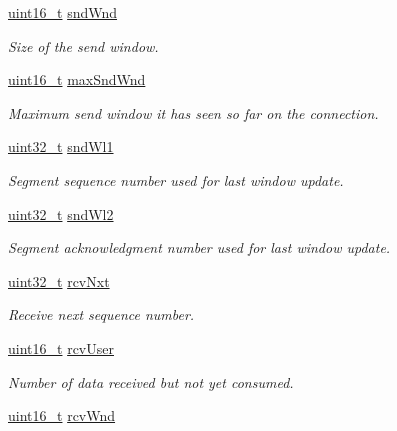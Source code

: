 \begin{DoxyCompactItemize}
\hyperlink{stdint_8h_a273cf69d639a59973b6019625df33e30}{uint16\+\_\+t} \hyperlink{struct__Socket_a117c709f1b5ed3943578618b3c509d35}{snd\+Wnd}
\begin{DoxyCompactList}\small\item\em Size of the send window. \end{DoxyCompactList}\item 
\hyperlink{stdint_8h_a273cf69d639a59973b6019625df33e30}{uint16\+\_\+t} \hyperlink{struct__Socket_a04d1e4797f004268fe4aa0a88f2dc08a}{max\+Snd\+Wnd}
\begin{DoxyCompactList}\small\item\em Maximum send window it has seen so far on the connection. \end{DoxyCompactList}\item 
\hyperlink{stdint_8h_a435d1572bf3f880d55459d9805097f62}{uint32\+\_\+t} \hyperlink{struct__Socket_a4bd384572248e908c3cc7156f2780180}{snd\+Wl1}
\begin{DoxyCompactList}\small\item\em Segment sequence number used for last window update. \end{DoxyCompactList}\item 
\hyperlink{stdint_8h_a435d1572bf3f880d55459d9805097f62}{uint32\+\_\+t} \hyperlink{struct__Socket_a34ee9c14a49e2965f93bbf6ce3540e93}{snd\+Wl2}
\begin{DoxyCompactList}\small\item\em Segment acknowledgment number used for last window update. \end{DoxyCompactList}\item 
\hyperlink{stdint_8h_a435d1572bf3f880d55459d9805097f62}{uint32\+\_\+t} \hyperlink{struct__Socket_a35bacc9de52c79c6732d850b60e0b57a}{rcv\+Nxt}
\begin{DoxyCompactList}\small\item\em Receive next sequence number. \end{DoxyCompactList}\item 
\hyperlink{stdint_8h_a273cf69d639a59973b6019625df33e30}{uint16\+\_\+t} \hyperlink{struct__Socket_a6bea386a430525823ca87b6bcadc3726}{rcv\+User}
\begin{DoxyCompactList}\small\item\em Number of data received but not yet consumed. \end{DoxyCompactList}\item 
\hyperlink{stdint_8h_a273cf69d639a59973b6019625df33e30}{uint16\+\_\+t} \hyperlink{struct__Socket_a182223789152b47064aa6acc44dac609}{rcv\+Wnd}

\end{DoxyCompactItemize}
